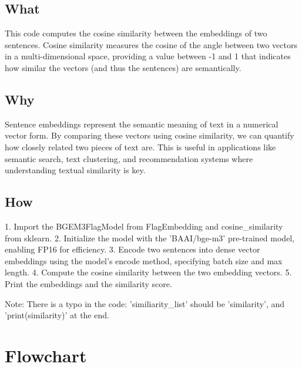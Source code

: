 \documentclass[11pt, a4paper]{article}
\begin{document}
\subsection{What}
This code computes the cosine similarity between the embeddings of two sentences. Cosine similarity measures the cosine of the angle between two vectors in a multi-dimensional space, providing a value between -1 and 1 that indicates how similar the vectors (and thus the sentences) are semantically.

\subsection{Why}
Sentence embeddings represent the semantic meaning of text in a numerical vector form. By comparing these vectors using cosine similarity, we can quantify how closely related two pieces of text are. This is useful in applications like semantic search, text clustering, and recommendation systems where understanding textual similarity is key.

\subsection{How}
1. Import the BGEM3FlagModel from FlagEmbedding and cosine\_similarity from sklearn.
2. Initialize the model with the 'BAAI/bge-m3' pre-trained model, enabling FP16 for efficiency.
3. Encode two sentences into dense vector embeddings using the model's encode method, specifying batch size and max length.
4. Compute the cosine similarity between the two embedding vectors.
5. Print the embeddings and the similarity score.

Note: There is a typo in the code: 'similiarity\_list' should be 'similarity', and 'print(similarity)' at the end.

\section{Flowchart}
\end{document}
